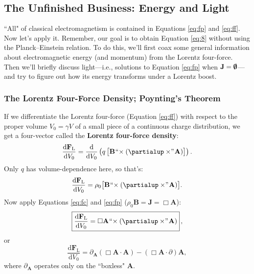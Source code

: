 \documentclass[12pt]{article}
\renewcommand{\vv}[1]{\mathbf{#1}}
\newcommand{\dd}[1]{\mathrm{d}#1}
\begin{document}
\subsection{The Unfinished Business: Energy and Light}

``All" of classical electromagnetism is contained in Equations \ref{eq:fp} and \ref{eq:ff}. Now let's apply it. Remember, our goal is to obtain Equation \ref{eq:8} without using the Planck--Einstein relation. To do this, we'll first coax some general information about electromagnetic energy (and momentum) from the Lorentz four-force. Then we'll briefly discuss light---i.e., solutions to Equation \ref{eq:fp} when $\vv J = \textrm{\mbox{\boldmath $\emptyset$}}$---and try to figure out how its energy transforms under a Lorentz boost.

\subsubsection{The Lorentz Four-Force Density; Poynting's Theorem}

If we differentiate the Lorentz four-force (Equation \ref{eq:ff}) with respect to the proper volume ${V_0 = \gamma V}$ of a small piece of a continuous charge distribution, we get a four-vector called the \textbf{Lorentz four-force density}:
\begin{equation*}
\dfrac{\dd \vv F_{\mathrm{L}}}{\dd V_0} = \dfrac{\dd}{\dd V_0} \left( q \, \bigl[ \vv B \mkern1mu `` \mkern-4mu \times (\partialup \times \mkern-4mu " \mkern1mu \vv A) \bigr]  \right) .
\end{equation*}
Only $q$ has volume-dependence here, so that's:
\begin{equation*}
\dfrac{\dd \vv F_{\mathrm{L}}}{\dd V_0} = \rho_0 \bigl[ \vv B \mkern1mu `` \mkern-4mu \times (\partialup \times \mkern-4mu " \mkern1mu \vv A) \bigr] .
\end{equation*}
Now apply Equations \ref{eq:fc} and \ref{eq:fp} ($\rho_0 \vv B = \vv J = \Box \vv A$):
\begin{equation}\label{eq:lffd}
\boxed{ \dfrac{\dd \vv F_{\mathrm{L}}}{\dd V_0} = \Box \vv A \mkern1mu `` \mkern-4mu \times (\partialup \times \mkern-4mu " \mkern1mu \vv A) } \, ,
\end{equation}
or
\begin{equation*}
\dfrac{\dd \vv F_{\mathrm{L}}}{\dd V_0} = \partialup_{\vv A} (\Box \vv A \cdot \vv A) - (\Box \vv A \cdot \partialup) \vv A ,
\end{equation*}
where $\partialup_{\vv A}$ operates only on the ``boxless" $\vv A$.
\end{document}
